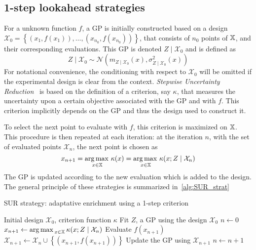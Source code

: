 \documentclass[../../Main_ManuscritThese.tex]{subfiles}
\begin{document}
\subsection{1-step lookahead strategies}
\label{ssec:1stepSUR}
For a unknown function $f$, a GP is initially constructed based on a design $\mathcal{X}_0 = \left\{\left(x_1,f(x_1)\right), \dots, \left(x_{n_0}, f(x_{n_0})\right)\right\}$, that consists of $n_0$ points of $\mathbb{X}$, and their corresponding evaluations. This GP is denoted $Z \mid \mathcal{X}_0$ and is defined as
\begin{equation}
  \label{eq:ZgivenXGP}
  Z\mid \mathcal{X}_0 \sim \mathcal{N}(m_{Z\mid\mathcal{X}_0}(x),\sigma^2_{Z\mid\mathcal{X}_0}(x))
\end{equation}
For notational convenience, the conditioning with respect to $\mathcal{X}_0$ will be omitted if the experimental design is clear from the context.
\emph{Stepwise Uncertainty Reduction}~\cite{villemonteix_informational_2006} is based on the definition of a criterion, say $\kappa$, that measures the uncertainty upon a certain objective associated with the GP and with $f$. This criterion implicitly depends on the GP and thus the design used to construct it.

To select the next point to evaluate with $f$, this criterion is maximized on $\mathbb{X}$.
This procedure is then repeated at each iteration: at the iteration $n$, with the set of evaluated points $\mathcal{X}_n$, the next point is chosen as
\begin{equation}
  x_{n+1} = \operatorname*{arg\,max \,}_{x\in\mathbb{X}} \kappa(x) = \operatorname*{arg\,max \,}_{x\in\mathbb{X}} \kappa(x; Z \mid \mathcal{X}_n)
\end{equation}
The GP is updated according to the new evaluation which is added to the design. The general principle of these strategies is summarized in~\cref{alg:SUR_strat}

\begin{algorithm}
  \caption{\label{alg:SUR_strat} SUR strategy: adaptative enrichment using a 1-step criterion}
\begin{algorithmic}
\REQUIRE Initial design $\mathcal{X}_0$, criterion function $\kappa$
\STATE Fit $Z$, a GP using the design $\mathcal{X}_0$
\STATE $n \leftarrow 0$
\STATE $x_{n+1} \leftarrow \operatorname*{arg\,max \,}_{x \in \mathbb{X}} \kappa(x; Z \mid \mathcal{X}_{n})$
\STATE Evaluate $f(x_{n+1})$
\STATE $\mathcal{X}_{n+1} \leftarrow \mathcal{X}_n \cup \left\{\left(x_{n+1}, f(x_{n+1})\right)\right\}$
\STATE Update the GP using $\mathcal{X}_{n+1}$
\STATE $n \leftarrow n + 1$
\ENDWHILE
\end{algorithmic}
\end{algorithm}
\end{document}
